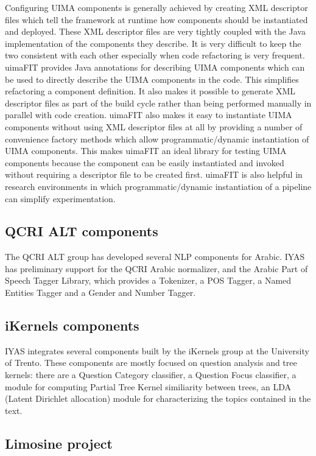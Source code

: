 \documentclass{wileysev}
\begin{document}
Configuring UIMA components is generally achieved by creating XML descriptor files which tell the framework at runtime how components should be instantiated and deployed. These XML descriptor files are very tightly coupled with the Java implementation of the components they describe. It is very difficult to keep the two consistent with each other especially when code refactoring is very frequent. uimaFIT provides Java annotations for describing UIMA components which can be used to directly describe the UIMA components in the code. This simplifies refactoring a component definition. It also makes it possible to generate XML descriptor files as part of the build cycle rather than being performed manually in parallel with code creation. uimaFIT also makes it easy to instantiate UIMA components without using XML descriptor files at all by providing a number of convenience factory methods which allow programmatic/dynamic instantiation of UIMA components. This makes uimaFIT an ideal library for testing UIMA components because the component can be easily instantiated and invoked without requiring a descriptor file to be created first. uimaFIT is also helpful in research environments in which programmatic/dynamic instantiation of a pipeline can simplify experimentation. 

\subsection[QCRI ALT components]{QCRI ALT components}

The QCRI ALT group has developed several NLP components for Arabic. IYAS has preliminary support for the QCRI Arabic normalizer, and the Arabic Part of Speech Tagger Library, which provides a Tokenizer, a POS Tagger, a Named Entities Tagger and a Gender and Number Tagger.

\subsection[iKernels components]{iKernels components}

IYAS integrates several components built by the iKernels group at the University of Trento. These components are mostly focused on question analysis and tree kernels: there are a Question Category classifier, a Question Focus classifier, a module for computing Partial Tree Kernel similiarity between trees, an LDA (Latent Dirichlet allocation) module for characterizing the topics contained in the text.  

\subsection[Limosine project]{Limosine project}
\end{document}
